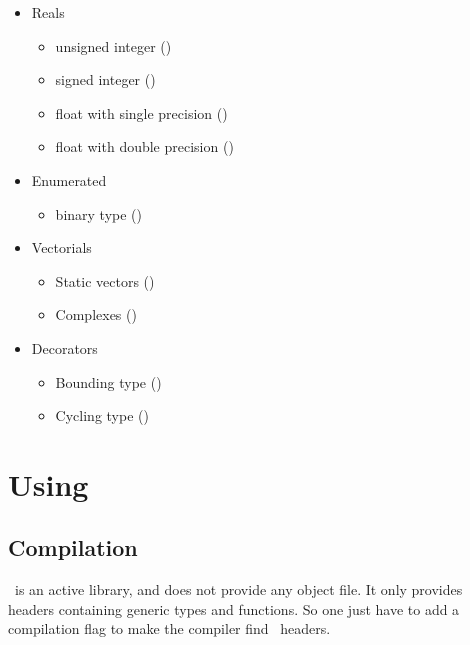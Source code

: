 \begin{itemize}

  \item Reals
  \begin{itemize}
    \item unsigned integer ()
    \item signed integer ()
    \item float with single precision ()
    \item float with double precision ()
  \end{itemize}

  \item Enumerated
  \begin{itemize}
    \item binary type ()
  \end{itemize}

  \item Vectorials
  \begin{itemize}
    \item Static vectors ()
    \item Complexes ()
  \end{itemize}

  \item Decorators
  \begin{itemize}
    \item Bounding type ()
    \item Cycling type ()
  \end{itemize}

\end{itemize}


\section{Using \integre}

\subsection{Compilation}

\integre\ is an active library, and does not provide any object
file. It only provides headers containing generic types and
functions. So one just have to add a compilation flag to make the
compiler find \integre\ headers.

